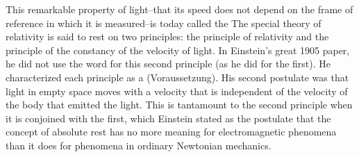 This remarkable property of light--that its speed does not depend on the frame of reference in which it is measured--is today called the  The special theory of relativity is said to rest on two principles: the principle of relativity and the principle of the constancy of the velocity of light. In Einstein's great 1905 paper, he did not use the word  for this second principle (as he did for the first). He characterized each principle as a  (Voraussetzung). His second postulate was that light in empty space moves with a velocity that is independent of the velocity of the body that emitted the light. This is tantamount to the second principle when it is conjoined with the first, which Einstein stated as the postulate that the concept of absolute rest has no more meaning for electromagnetic phenomena than it does for phenomena in ordinary Newtonian mechanics.




  

 